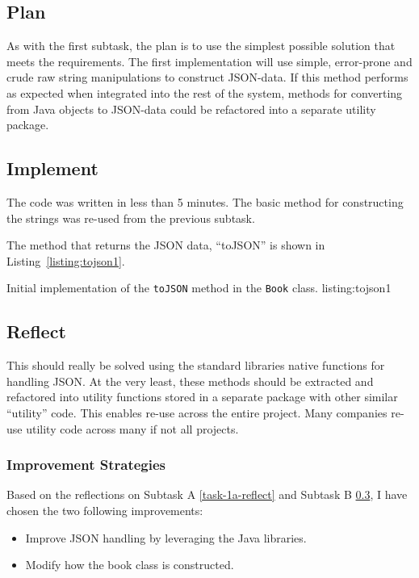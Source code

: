 \subsection{Plan}\label{task-1b-plan}
As with the first subtask, the plan is to use the simplest possible solution
that meets the requirements.
The first implementation will use simple, error-prone and crude raw string
manipulations to construct JSON-data.
If this method performs as expected when integrated into the rest of the system,
methods for converting from Java objects to JSON-data could be refactored into
a separate utility package.

\subsection{Implement}\label{task-1b-implement}
The code was written in less than 5 minutes. The basic method for
constructing the strings was re-used from the previous subtask.

The method that returns the JSON data, ``toJSON'' is shown in Listing~\ref{listing:tojson1}.

           {Initial implementation of the \texttt{toJSON\(\)} method in the
            \texttt{Book} class.}
           {listing:tojson1}



\subsection{Reflect}\label{task-1b-reflect}
This should really be solved using the standard libraries native functions for
handling JSON. 
At the very least, these methods should be extracted and refactored into
utility functions stored in a separate package with other similar ``utility''
code.  This enables re-use across the entire project. Many companies re-use
utility code across many if not all projects.


\subsubsection{Improvement Strategies}
Based on the reflections on Subtask A \ref{task-1a-reflect} and Subtask B
\ref{task-1b-reflect}, I have chosen the two following improvements:

\begin{itemize}
  \item Improve JSON handling by leveraging the Java libraries.
  \item Modify how the book class is constructed.
\end{itemize}





